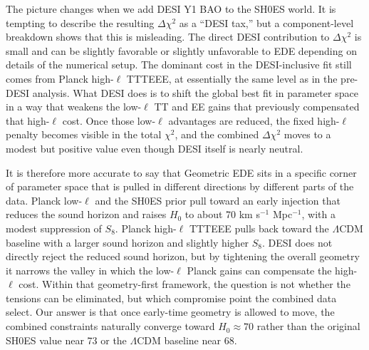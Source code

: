 \documentclass[a4paper,11pt]{article}
\begin{document}
The picture changes when we add DESI Y1 BAO to the SH0ES world. It is tempting to describe the resulting $\Delta\chi^2$ as a ``DESI tax,'' but a component-level breakdown shows that this is misleading. The direct DESI contribution to $\Delta\chi^2$ is small and can be slightly favorable or slightly unfavorable to EDE depending on details of the numerical setup. The dominant cost in the DESI-inclusive fit still comes from Planck high-$\ell$ TTTEEE, at essentially the same level as in the pre-DESI analysis. What DESI does is to shift the global best fit in parameter space in a way that weakens the low-$\ell$ TT and EE gains that previously compensated that high-$\ell$ cost. Once those low-$\ell$ advantages are reduced, the fixed high-$\ell$ penalty becomes visible in the total $\chi^2$, and the combined $\Delta\chi^2$ moves to a modest but positive value even though DESI itself is nearly neutral.

It is therefore more accurate to say that Geometric EDE sits in a specific corner of parameter space that is pulled in different directions by different parts of the data. Planck low-$\ell$ and the SH0ES prior pull toward an early injection that reduces the sound horizon and raises $H_0$ to about 70 km s$^{-1}$ Mpc$^{-1}$, with a modest suppression of $S_8$. Planck high-$\ell$ TTTEEE pulls back toward the $\Lambda$CDM baseline with a larger sound horizon and slightly higher $S_8$. DESI does not directly reject the reduced sound horizon, but by tightening the overall geometry it narrows the valley in which the low-$\ell$ Planck gains can compensate the high-$\ell$ cost. Within that geometry-first framework, the question is not whether the tensions can be eliminated, but which compromise point the combined data select. Our answer is that once early-time geometry is allowed to move, the combined constraints naturally converge toward $H_0 \approx 70$ rather than the original SH0ES value near 73 or the $\Lambda$CDM baseline near 68.
\end{document}

